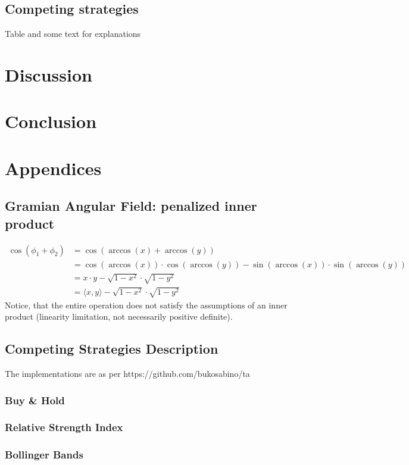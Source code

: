 \documentclass[11pt, a4paper]{article}
\begin{document}
\subsection{Competing strategies}
Table and some text for explanations

\section{Discussion}
\label{sec:Discuss}

\section{Conclusion}
\label{sec:Conclusion}

\section{Appendices}
\label{sec:App}

\subsection{Gramian Angular Field: penalized inner product}
\label{app:GAF}
\begin{equation}
    \begin{split}
        \cos(\phi_1 + \phi_2)  & = \cos(\arccos(x) + \arccos(y)) \\
        & = \cos(\arccos(x)) \cdot \cos(\arccos(y)) - \sin(\arccos(x)) \cdot \sin(\arccos(y))\\
        & = x\cdot y - \sqrt{1-x^2} \cdot \sqrt{1-y^2}\\
        & = \langle x, y \rangle - \sqrt{1-x^2} \cdot \sqrt{1-y^2}
    \end{split}
\end{equation}
 Notice, that the entire operation does not satisfy the assumptions of an inner product (linearity limitation, not necessarily positive definite).

\subsection{Competing Strategies Description}
\label{app:CompetingStrats}

The implementations are as per https://github.com/bukosabino/ta

\subsubsection{Buy \& Hold}

\subsubsection{Relative Strength Index}

\subsubsection{Bollinger Bands}



\end{document}
